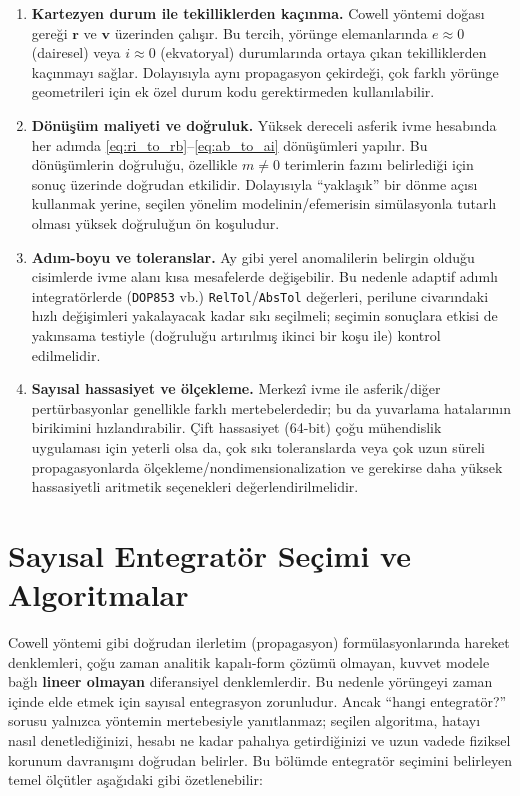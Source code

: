 \begin{enumerate}
\item \textbf{Kartezyen durum ile tekilliklerden kaçınma.}
Cowell yöntemi doğası gereği $\mathbf r$ ve $\mathbf v$ üzerinden çalışır.
Bu tercih, yörünge elemanlarında $e\approx 0$ (dairesel) veya $i\approx 0$ (ekvatoryal) durumlarında ortaya çıkan
tekilliklerden kaçınmayı sağlar. Dolayısıyla aynı propagasyon çekirdeği, çok farklı yörünge geometrileri için
ek özel durum kodu gerektirmeden kullanılabilir.

\item \textbf{Dönüşüm maliyeti ve doğruluk.}
Yüksek dereceli asferik ivme hesabında her adımda \eqref{eq:ri_to_rb}--\eqref{eq:ab_to_ai} dönüşümleri yapılır.
Bu dönüşümlerin doğruluğu, özellikle $m\neq 0$ terimlerin fazını belirlediği için sonuç üzerinde doğrudan etkilidir.
Dolayısıyla ``yaklaşık'' bir dönme açısı kullanmak yerine, seçilen yönelim modelinin/efemerisin simülasyonla tutarlı olması
yüksek doğruluğun ön koşuludur.

\item \textbf{Adım-boyu ve toleranslar.}
Ay gibi yerel anomalilerin belirgin olduğu cisimlerde ivme alanı kısa mesafelerde değişebilir.
Bu nedenle adaptif adımlı integratörlerde (\texttt{DOP853} vb.) \texttt{RelTol}/\texttt{AbsTol} değerleri,
perilune civarındaki hızlı değişimleri yakalayacak kadar sıkı seçilmeli; seçimin sonuçlara etkisi de yakınsama testiyle
(doğruluğu artırılmış ikinci bir koşu ile) kontrol edilmelidir.

\item \textbf{Sayısal hassasiyet ve ölçekleme.}
Merkezî ivme ile asferik/diğer pertürbasyonlar genellikle farklı mertebelerdedir; bu da yuvarlama hatalarının birikimini
hızlandırabilir. Çift hassasiyet (64-bit) çoğu mühendislik uygulaması için yeterli olsa da, çok sıkı toleranslarda veya çok
uzun süreli propagasyonlarda ölçekleme/nondimensionalization ve gerekirse daha yüksek hassasiyetli aritmetik seçenekleri
değerlendirilmelidir.
\end{enumerate}


\newpage
\section{Sayısal Entegratör Seçimi ve Algoritmalar}

Cowell yöntemi gibi doğrudan ilerletim (propagasyon) formülasyonlarında hareket denklemleri,
çoğu zaman analitik kapalı-form çözümü olmayan, kuvvet modele bağlı \textbf{lineer olmayan} diferansiyel denklemlerdir.
Bu nedenle yörüngeyi zaman içinde elde etmek için sayısal entegrasyon zorunludur. Ancak ``hangi entegratör?''
sorusu yalnızca yöntemin mertebesiyle yanıtlanmaz; seçilen algoritma, hatayı nasıl denetlediğinizi,
hesabı ne kadar pahalıya getirdiğinizi ve uzun vadede fiziksel korunum davranışını doğrudan belirler.
Bu bölümde entegratör seçimini belirleyen temel ölçütler aşağıdaki gibi özetlenebilir:

